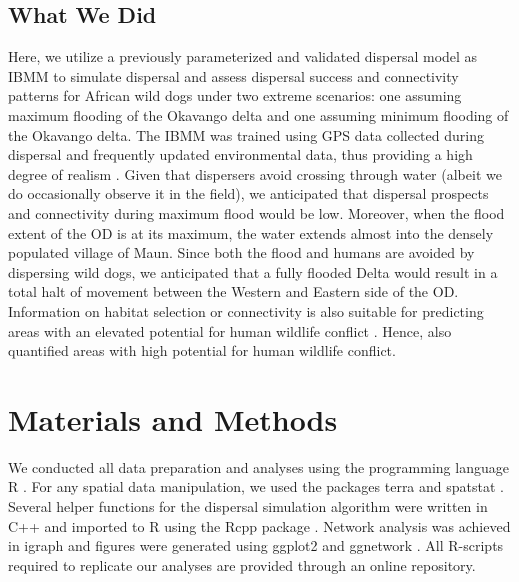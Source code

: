 \documentclass[abstract=on,10pt,a4paper,bibliography=totocnumbered]{article}
\begin{document}
\subsection{What We Did}
Here, we utilize a previously parameterized and validated dispersal model as
IBMM to simulate dispersal and assess dispersal success and connectivity
patterns for African wild dogs under two extreme scenarios: one assuming maximum
flooding of the Okavango delta and one assuming minimum flooding of the Okavango
delta. The IBMM was trained using GPS data collected during dispersal and
frequently updated environmental data, thus providing a high degree of realism
\citep{Hofmann.2021}. Given that dispersers avoid crossing through water (albeit
we do occasionally observe it in the field), we anticipated that dispersal
prospects and connectivity during maximum flood would be low. Moreover,  when
the flood extent of the OD is at its maximum, the water extends almost into the
densely populated village of Maun. Since both the flood and humans are avoided
by dispersing wild dogs, we anticipated that a fully flooded Delta would result
in a total halt of movement between the Western and Eastern side of the OD.
Information on habitat selection or connectivity is also suitable for predicting
areas with an elevated potential for human wildlife conflict
\citep{Buchholtz.2020}. Hence, also quantified areas with high potential for
human wildlife conflict.

\section{Materials and Methods}
We conducted all data preparation and analyses using the programming language
\textsf{R} \citep{RCoreTeam.2022}. For any spatial data manipulation, we used
the packages \textsf{terra} \citep{Hijmans.2022} and \textsf{spatstat}
\citep{Baddeley.2015}. Several helper functions for the dispersal simulation
algorithm were written in \textsf{C++} and imported to R using the \textsf{Rcpp}
package \citep{Eddelbuettel.2011}. Network analysis was achieved in
\textsf{igraph} \citep{Csardi.2006} and figures were generated using
\textsf{ggplot2} \citep{Wickham.2016} and \textsf{ggnetwork}
\citep{Briatte.2021}. All R-scripts required to replicate our analyses are
provided through an online repository.
\end{document}
